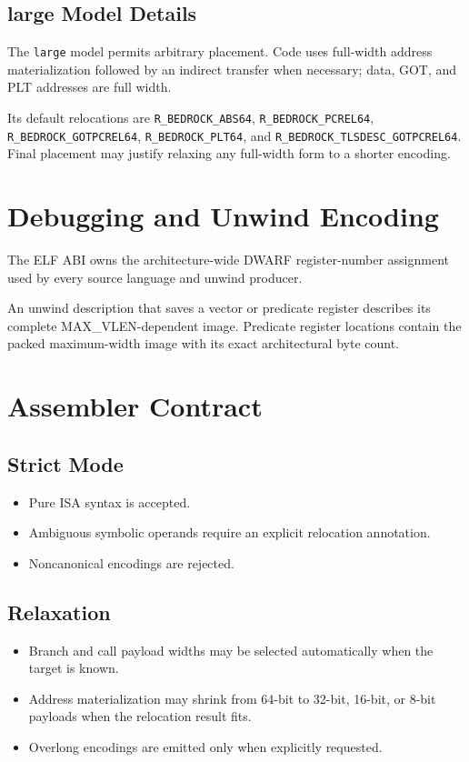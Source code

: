 \documentclass[10pt,twoside]{article}
\begin{document}
\subsection{large Model Details}
The \texttt{large} model permits arbitrary placement. Code uses full-width
address materialization followed by an indirect transfer when necessary; data,
GOT, and PLT addresses are full width.

Its default relocations are \texttt{R\_BEDROCK\_ABS64},
\texttt{R\_BEDROCK\_PCREL64}, \texttt{R\_BEDROCK\_GOTPCREL64},
\texttt{R\_BEDROCK\_PLT64}, and
\texttt{R\_BEDROCK\_TLSDESC\_GOTPCREL64}. Final placement may justify
relaxing any full-width form to a shorter encoding.

\clearpage
\section{Debugging and Unwind Encoding}\label{page:debugging-and-unwind}
The ELF ABI owns the architecture-wide DWARF register-number assignment used
by every source language and unwind producer.

\BedrockGeneratedELFDebugRegisterTable

An unwind description that saves a vector or predicate register describes its
complete MAX\_VLEN-dependent image. Predicate register locations contain the
packed maximum-width image with its exact architectural byte count.

\clearpage
\section{Assembler Contract}\label{page:assembler-contract}
\subsection{Strict Mode}
\begin{itemize}
\item Pure ISA syntax is accepted.
\item Ambiguous symbolic operands require an explicit relocation annotation.
\item Noncanonical encodings are rejected.
\end{itemize}
\subsection{Relaxation}
\begin{itemize}
\item Branch and call payload widths may be selected automatically when the target is known.
\item Address materialization may shrink from 64-bit to 32-bit, 16-bit, or 8-bit payloads when the relocation result fits.
\item Overlong encodings are emitted only when explicitly requested.
\end{itemize}
\end{document}
